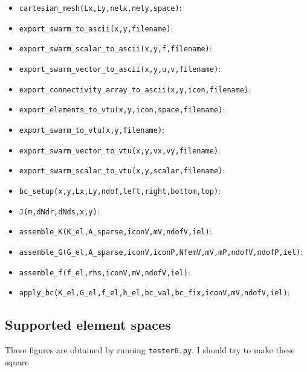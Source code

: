 \begin{itemize}
\begin{itemize}
\item \lstinline{cartesian_mesh(Lx,Ly,nelx,nely,space)}:
\item \lstinline{export_swarm_to_ascii(x,y,filename)}:
\item \lstinline{export_swarm_scalar_to_ascii(x,y,f,filename)}:
\item \lstinline{export_swarm_vector_to_ascii(x,y,u,v,filename)}:
\item \lstinline{export_connectivity_array_to_ascii(x,y,icon,filename)}:
\item \lstinline{export_elements_to_vtu(x,y,icon,space,filename)}:
\item \lstinline{export_swarm_to_vtu(x,y,filename)}:
\item \lstinline{export_swarm_vector_to_vtu(x,y,vx,vy,filename)}:
\item \lstinline{export_swarm_scalar_to_vtu(x,y,scalar,filename)}:
\item \lstinline{bc_setup(x,y,Lx,Ly,ndof,left,right,bottom,top)}:
\item \lstinline{J(m,dNdr,dNds,x,y)}:
\item \lstinline{assemble_K(K_el,A_sparse,iconV,mV,ndofV,iel)}:
\item \lstinline{assemble_G(G_el,A_sparse,iconV,iconP,NfemV,mV,mP,ndofV,ndofP,iel)}:
\item \lstinline{assemble_f(f_el,rhs,iconV,mV,ndofV,iel)}:
\item \lstinline{apply_bc(K_el,G_el,f_el,h_el,bc_val,bc_fix,iconV,mV,ndofV,iel)}:
\end{itemize}

\end{itemize}

\newpage
\subsection*{Supported element spaces}

These figures are obtained by running \lstinline{tester6.py}.
{\color{red} I should try to make these square}


